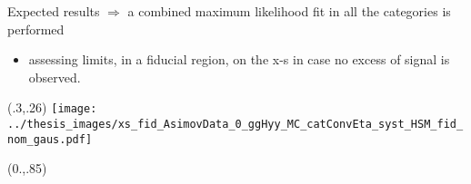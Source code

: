 \documentclass[10pt,UKenglish, leqno, xcolor = dvipsnames]{beamer}
\begin{document}
	\begin{frame}{Expected results}
		\vspace{.4cm}
		$\Longrightarrow$ a combined maximum likelihood fit in all the categories is performed
		\begin{itemize}
			\item assessing limits, in a fiducial region, on the x-s in case no excess of signal is observed.
		\end{itemize}		
		\begin{textblock}{1}(.3,.26)
			\texttt{[image: ../thesis\_images/xs\_fid\_AsimovData\_0\_ggHyy\_MC\_catConvEta\_syst\_HSM\_fid\_nom\_gaus.pdf]}	
		\end{textblock}
		\begin{textblock}{1}(0.,.85)
			\begin{figure}
			\end{figure}
		\end{textblock}
	\end{frame}
\end{document}
